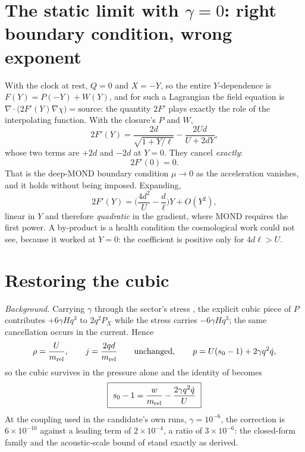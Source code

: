 \documentclass[11pt,letterpaper]{article}
\begin{document}
\section{The static limit with $\gamma=0$: right boundary condition, wrong exponent}
With the clock at rest, $Q=0$ and $X=-Y$, so the entire $Y$-dependence is $F(Y)=P(-Y)+W(Y)$, and for such a Lagrangian the field equation is $\nabla\!\cdot\!\big(2F'(Y)\nabla\chi\big)=\text{source}$: the quantity $2F'$ plays exactly the role of the interpolating function. With the closure's $P$ and $W$,
\begin{equation}
2F'(Y)=\frac{2d}{\sqrt{1+Y/\ell}}-\frac{2Ud}{U+2dY},
\end{equation}
whose two terms are $+2d$ and $-2d$ at $Y=0$. They cancel \emph{exactly}:
\begin{equation}
2F'(0)=0 .
\end{equation}
That is the deep-MOND boundary condition $\mu\to0$ as the acceleration vanishes, and it holds without being imposed. Expanding,
\begin{equation}
2F'(Y)=\Big(\frac{4d^2}{U}-\frac{d}{\ell}\Big)Y+O(Y^2),
\end{equation}
linear in $Y$ and therefore \emph{quadratic} in the gradient, where MOND requires the first power. A by-product is a health condition the cosmological work could not see, because it worked at $Y=0$: the coefficient is positive only for $4d\ell>U$.

\section{Restoring the cubic}
\emph{Background.} Carrying $\gamma$ through the sector's stress \cite{paper13}, the explicit cubic piece of $P$ contributes $+6\gamma Hq^3$ to $2q^2P_X$ while the stress carries $-6\gamma Hq^3$; the same cancellation occurs in the current. Hence
\begin{equation}
\rho=\frac{U}{m_{\rm rel}},\qquad j=\frac{2qd}{m_{\rm rel}}\qquad\text{unchanged},\qquad p=U(s_0-1)+2\gamma q^2\dot q ,
\end{equation}
so the cubic survives in the pressure alone and the identity of \cite{paper21} becomes
\begin{equation}
\boxed{\ s_0-1=\frac{w}{m_{\rm rel}}-\frac{2\gamma q^2\dot q}{U}\ }
\label{identity}
\end{equation}
At the coupling used in the candidate's own runs, $\gamma=10^{-6}$, the correction is $6\times10^{-10}$ against a leading term of $2\times10^{-4}$, a ratio of $3\times10^{-6}$: the closed-form family and the acoustic-scale bound of \cite{paper21} stand exactly as derived.
\end{document}
